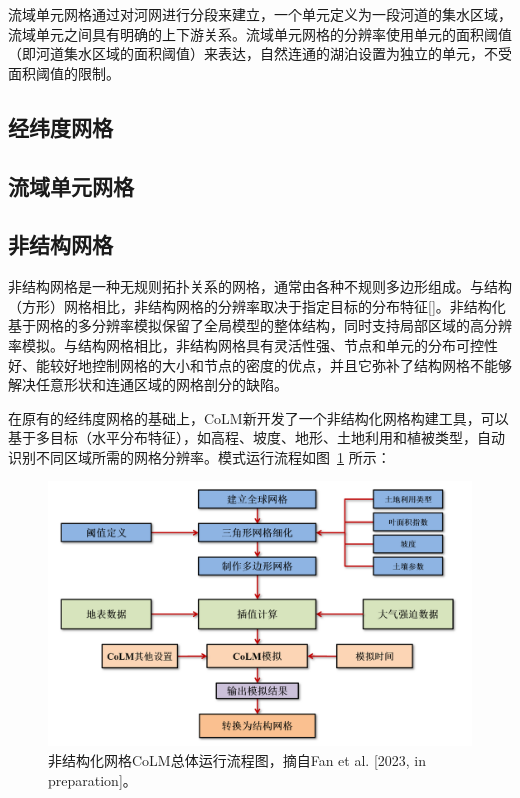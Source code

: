 流域单元网格通过对河网进行分段来建立，一个单元定义为一段河道的集水区域，流域单元之间具有明确的上下游关系。流域单元网格的分辨率使用单元的面积阈值（即河道集水区域的面积阈值）来表达，自然连通的湖泊设置为独立的单元，不受面积阈值的限制。


\subsection{经纬度网格}\label{经纬度网格}


\subsection{流域单元网格}\label{流域单元网格}


\subsection{非结构网格}\label{非结构网格}
非结构网格是一种无规则拓扑关系的网格，通常由各种不规则多边形组成。与结构（方形）网格相比，非结构网格的分辨率取决于指定目标的分布特征[]。非结构化基于网格的多分辨率模拟保留了全局模型的整体结构，同时支持局部区域的高分辨率模拟。与结构网格相比，非结构网格具有灵活性强、节点和单元的分布可控性好、能较好地控制网格的大小和节点的密度的优点，并且它弥补了结构网格不能够解决任意形状和连通区域的网格剖分的缺陷。

在原有的经纬度网格的基础上，CoLM新开发了一个非结构化网格构建工具，可以基于多目标（水平分布特征），如高程、坡度、地形、土地利用和植被类型，自动识别不同区域所需的网格分辨率。模式运行流程如图~\ref{fig:非结构化网格CoLM总体运行流程图} 所示：
 {
\begin{figure}[htbp]
\centering
\includegraphics{Figures/模式构架/非结构化网格CoLM总体运行流程图.png}
\caption{非结构化网格CoLM总体运行流程图，摘自Fan et al. [2023, in preparation]。}
\label{fig:非结构化网格CoLM总体运行流程图}
\end{figure}
}

